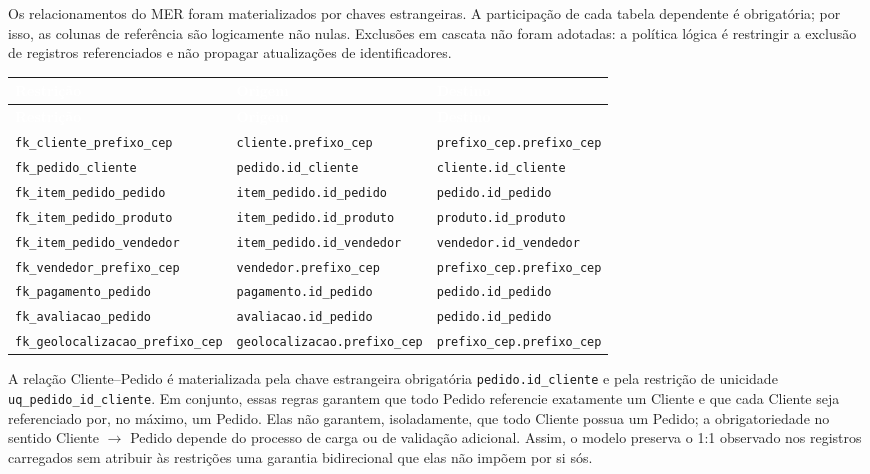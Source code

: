 \documentclass[12pt,a4paper]{article}
\begin{document}
	Os relacionamentos do MER foram materializados por chaves estrangeiras. A
	participação de cada tabela dependente é obrigatória; por isso, as colunas de
	referência são logicamente não nulas. Exclusões em cascata não foram adotadas:
	a política lógica é restringir a exclusão de registros referenciados e não
	propagar atualizações de identificadores.

	{\small
		\renewcommand{\arraystretch}{1.4}
		\begin{longtable}{|>{\raggedright\arraybackslash}p{4.6cm}|>{\raggedright\arraybackslash}p{5.2cm}|>{\raggedright\arraybackslash}p{4.8cm}|}
			\hline
			\rowcolor{AzulCorporativo}
			\textcolor{white}{\textbf{Restrição}} & \textcolor{white}{\textbf{Origem}} & \textcolor{white}{\textbf{Destino}} \\ \hline
			\endfirsthead
			\hline
			\rowcolor{AzulCorporativo}
			\textcolor{white}{\textbf{Restrição}} & \textcolor{white}{\textbf{Origem}} & \textcolor{white}{\textbf{Destino}} \\ \hline
			\endhead
			\texttt{fk\_cliente\_prefixo\_cep} & \texttt{cliente.prefixo\_cep} & \texttt{prefixo\_cep.prefixo\_cep} \\ \hline
			\texttt{fk\_pedido\_cliente} & \texttt{pedido.id\_cliente} & \texttt{cliente.id\_cliente} \\ \hline
			\texttt{fk\_item\_pedido\_pedido} & \texttt{item\_pedido.id\_pedido} & \texttt{pedido.id\_pedido} \\ \hline
			\texttt{fk\_item\_pedido\_produto} & \texttt{item\_pedido.id\_produto} & \texttt{produto.id\_produto} \\ \hline
			\texttt{fk\_item\_pedido\_vendedor} & \texttt{item\_pedido.id\_vendedor} & \texttt{vendedor.id\_vendedor} \\ \hline
			\texttt{fk\_vendedor\_prefixo\_cep} & \texttt{vendedor.prefixo\_cep} & \texttt{prefixo\_cep.prefixo\_cep} \\ \hline
			\texttt{fk\_pagamento\_pedido} & \texttt{pagamento.id\_pedido} & \texttt{pedido.id\_pedido} \\ \hline
			\texttt{fk\_avaliacao\_pedido} & \texttt{avaliacao.id\_pedido} & \texttt{pedido.id\_pedido} \\ \hline
			\texttt{fk\_geolocalizacao\_\allowbreak prefixo\_cep} & \texttt{geolocalizacao.prefixo\_cep} & \texttt{prefixo\_cep.prefixo\_cep} \\ \hline
	\end{longtable}}

	A relação Cliente--Pedido é materializada pela chave estrangeira obrigatória
	\texttt{pedido.id\_\hspace{0pt}cliente} e pela restrição de unicidade
	\texttt{uq\_pedido\_id\_\hspace{0pt}cliente}. Em conjunto, essas regras garantem que todo
	Pedido referencie exatamente um Cliente e que cada Cliente seja referenciado
	por, no máximo, um Pedido. Elas não garantem, isoladamente, que todo Cliente
	possua um Pedido; a obrigatoriedade no sentido Cliente $\rightarrow$ Pedido
	depende do processo de carga ou de validação adicional. Assim, o modelo
	preserva o 1:1 observado nos registros carregados sem atribuir às restrições uma
	garantia bidirecional que elas não impõem por si sós.
\end{document}
